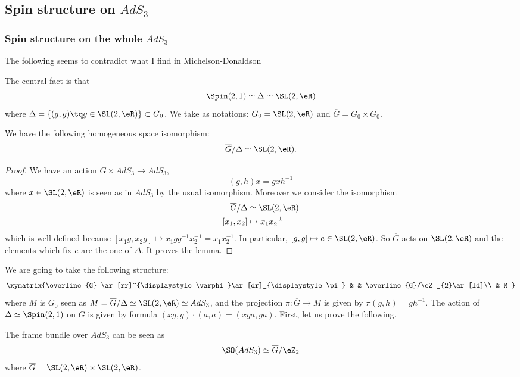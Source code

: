 \subsection{Spin structure on \texorpdfstring{$AdS_3$}{AdS3} }

\subsubsection{Spin structure on the whole \texorpdfstring{$AdS_3$}{AdS3} }

\begin{probleme}
	The following seems to contradict what I find in Michelson-Donaldson
\end{probleme}
The central fact is that
\[
	\Spin(2,1)\simeq\Delta\simeq\SL(2,\eR)
\]
where $\Delta=\{ (g,g)\tq g\in\SL(2,\eR) \}\subset G_0$. We take as notations: $G_{0}=\SL(2,\eR)$ and $\overline{G}=G_0\times G_{0}$.

\begin{lemma}
	We have the following homogeneous space isomorphism:
	\[
		\overline{G}/\Delta\simeq\SL(2,\eR).
	\]
\end{lemma}

\begin{proof}

	We have an action $\overline{G}\times AdS_3\to AdS_3$,
	\begin{equation} \label{EqActghgxh}
		(g,h)x=gxh^{-1}
	\end{equation}
	where $x\in\SL(2,\eR)$ is seen as in $AdS_3$ by the usual isomorphism. Moreover we consider the isomorphism
	\begin{align}
		\overline{G}/\Delta & \simeq\SL(2,\eR)    \\
		[x_1,x_2]           & \mapsto x_1x_2^{-1}
	\end{align}
	which is well defined because $[x_1g,x_2g]\mapsto x_1gg^{-1}x_2^{-1}=x_1x_2^{-1}$. In particular, $[g,g]\mapsto e\in\SL(2,\eR)$. So $\overline{G}$ acts on $\SL(2,\eR)$ and the elements which fix $e$ are the one of $\Delta$. It proves the lemma.
\end{proof}

We are going to take the following structure:
\begin{equation}  \label{EqScSpinAdS}
	\xymatrix{%
		\overline{G} \ar[rr]^{\displaystyle\varphi}\ar[dr]_{\displaystyle\pi}    &   &   \overline{G}/\eZ_{2}\ar[ld]\\
		& M
	}
\end{equation}
where $M$ is $G_0$ seen as $M=\overline{G}/\Delta\simeq \SL(2,\eR)\simeq AdS_3$, and the projection $\pi\colon \overline{G}\to M$ is given by $\pi(g,h)=gh^{-1}$. The action of $\Delta\simeq \Spin(2,1)$ on $\overline{G}$ is given by formula $(xg,g)\cdot (a,a)=(xga,ga)$. First, let us prove the following.
\begin{proposition}
	The frame bundle over $AdS_3$ can be seen as
	\[
		\SO(AdS_3)\simeq \overline{G}/\eZ_{2}
	\]
	where $\overline{G}=\SL(2,\eR)\times\SL(2,\eR)$.
\end{proposition}

